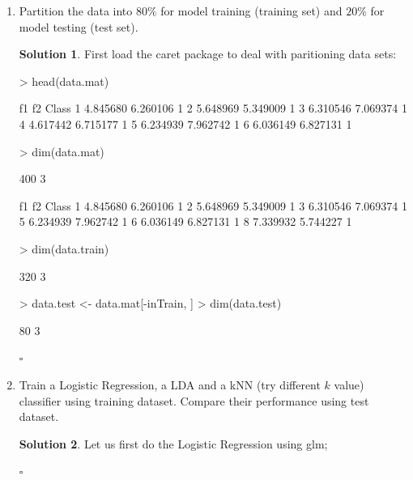 \documentclass[twoside]{article}
\theoremstyle{definition}
\newtheorem*{solutionT}{Solution}
\newenvironment{solution}{\begin{cBox}\begin{solutionT}}{\hfill{\scriptsize\ensuremath{\square}}\end{solutionT}\end{cBox}}
\theoremstyle{definition}
\begin{document}
\begin{enumerate}
  \item Partition the data into $80\%$ for model training (training set) and $20\%$ for model testing (test set).
  
  \begin{solution}
  First load the caret package to deal with paritioning data sets:
\begin{Schunk}
\begin{Sinput}
> head(data.mat)
\end{Sinput}
\begin{Soutput}
        f1       f2 Class
1 4.845680 6.260106     1
2 5.648969 5.349009     1
3 6.310546 7.069374     1
4 4.617442 6.715177     1
5 6.234939 7.962742     1
6 6.036149 6.827131     1
\end{Soutput}
\begin{Sinput}
> dim(data.mat)
\end{Sinput}
\begin{Soutput}
[1] 400   3
\end{Soutput}
\begin{Soutput}
        f1       f2 Class
1 4.845680 6.260106     1
2 5.648969 5.349009     1
3 6.310546 7.069374     1
5 6.234939 7.962742     1
6 6.036149 6.827131     1
8 7.339932 5.744227     1
\end{Soutput}
\begin{Sinput}
> dim(data.train)
\end{Sinput}
\begin{Soutput}
[1] 320   3
\end{Soutput}
\begin{Sinput}
> data.test <- data.mat[-inTrain, ]
> dim(data.test)
\end{Sinput}
\begin{Soutput}
[1] 80  3
\end{Soutput}
\end{Schunk}
      
  \end{solution}
  \item Train a Logistic Regression, a LDA and a kNN (try different $k$ value) classifier using
training dataset. Compare their performance using test dataset. 
    
   \begin{solution} 
   Let us first do the Logistic Regression using glm;
   

\end{solution}
\end{enumerate}
\end{document}
